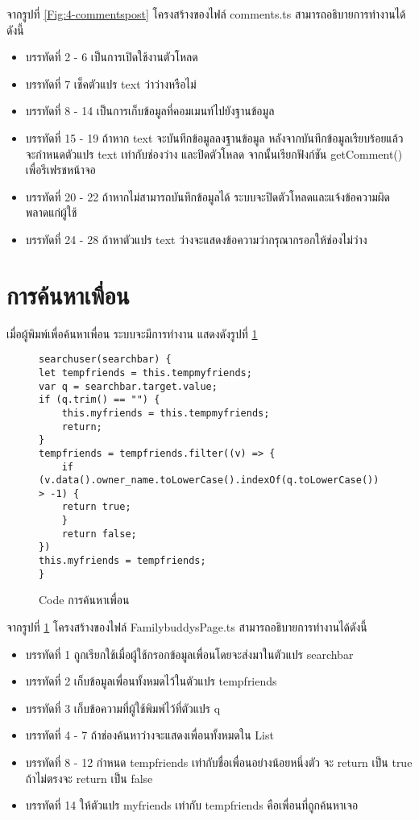 จากรูปที่ \ref{Fig:4-commentspost} โครงสร้างของไฟล์ comments.ts สามารถอธิบายการทำงานได้ดังนี้
\begin{itemize}[label={--}]
\item บรรทัดที่ 2 - 6 เป็นการเปิดใช้งานตัวโหลด
\item บรรทัดที่ 7 เช็คตัวแปร text ว่าว่างหรือไม่
\item บรรทัดที่ 8 - 14 เป็นการเก็บข้อมูลที่คอมเมนท์ไปยังฐานข้อมูล
\item บรรทัดที่ 15 - 19 ถ้าหาก text จะบันทึกข้อมูลลงฐานข้อมูล หลังจากบันทึกข้อมูลเรียบร้อยแล้ว จะกำหนดตัวแปร text เท่ากับช่องว่าง และปิดตัวโหลด จากนั้นเรียกฟังก์ชัน getComment() เพื่อรีเฟรชหน้าจอ
\item บรรทัดที่ 20 - 22 ถ้าหากไม่สามารถบันทึกข้อมูลได้ ระบบจะปิดตัวโหลดและแจ้งข้อความผิดพลาดแก่ผู้ใช้
\item บรรทัดที่ 24 - 28 ถ้าหาตัวแปร text ว่างจะแสดงข้อความว่ากรุณากรอกให้ช่องไม่ว่าง
\end{itemize}
\newpage





\section{การค้นหาเพื่อน}
เมื่อผู้พิมพ์เพื่อค้นหาเพื่อน ระบบจะมีการทำงาน แสดงดังรูปที่ \ref{Fig:4-addfamily}

\begin{figure}[H]
{\lstset{language=Pascal}
\begin{lstlisting}
searchuser(searchbar) {
let tempfriends = this.tempmyfriends;
var q = searchbar.target.value;
if (q.trim() == "") {
	this.myfriends = this.tempmyfriends;
	return;
}
tempfriends = tempfriends.filter((v) => {
	if (v.data().owner_name.toLowerCase().indexOf(q.toLowerCase()) > -1) {
	return true;
	}
	return false;
})
this.myfriends = tempfriends;
}
\end{lstlisting}}
\caption{Code การค้นหาเพื่อน}
\label{Fig:4-addfamily}
\end{figure}
จากรูปที่ \ref{Fig:4-addfamily} โครงสร้างของไฟล์ FamilybuddysPage.ts สามารถอธิบายการทำงานได้ดังนี้
\begin{itemize}[label={--}]
\item บรรทัดที่ 1 ถูกเรียกใช้เมื่อผู้ใช้กรอกข้อมูลเพื่อนโดยจะส่งมาในตัวแปร searchbar
\item บรรทัดที่ 2 เก็บข้อมูลเพื่อนทั้งหมดไว้ในตัวแปร tempfriends
\item บรรทัดที่ 3 เก็บข้อความที่ผู้ใช้พิมพ์ไว้ที่ตัวแปร q
\item บรรทัดที่ 4 - 7 ถ้าช่องค้นหาว่างจะแสดงเพื่อนทั้งหมดใน List
\item บรรทัดที่ 8 - 12 กำหนด tempfriends เท่ากับชื่อเพื่อนอย่างน้อยหนึ่งตัว จะ return เป็น true ถ้าไม่ตรงจะ return เป็น false
\item บรรทัดที่ 14 ให้ตัวแปร myfriends เท่ากับ tempfriends คือเพื่อนที่ถูกค้นหาเจอ
\end{itemize}

